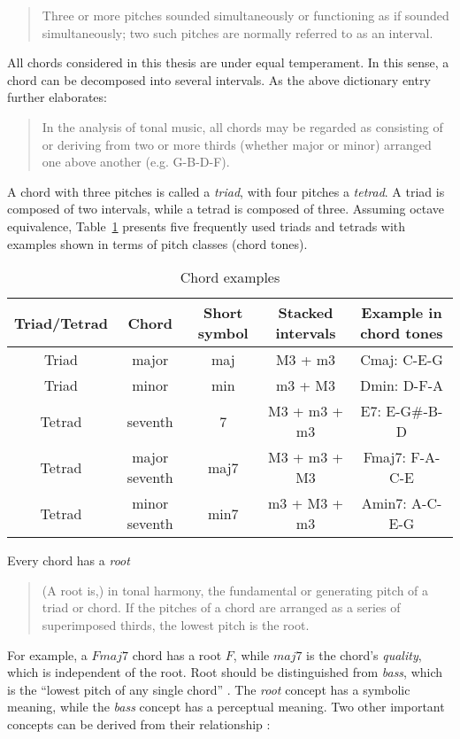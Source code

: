 \begin{quote}
Three or more pitches sounded simultaneously or functioning as if sounded simultaneously; two such pitches are normally referred to as an interval.
\end{quote}

All chords considered in this thesis are under equal temperament. In this sense, a chord can be decomposed into several intervals. As the above dictionary entry further elaborates:

\begin{quote}
In the analysis of tonal music, all chords may be regarded as consisting of or deriving from two or more thirds (whether major or minor) arranged one above another (e.g. G-B-D-F).
\end{quote}

A chord with three pitches is called a {\it triad}, with four pitches a {\it tetrad}. A triad is composed of two intervals, while a tetrad is composed of three. Assuming octave equivalence, Table~\ref{tab:2-chords} presents five frequently used triads and tetrads with examples shown in terms of pitch classes (chord tones).
\begin{table}
\caption{Chord examples}
\centering
\scriptsize
\begin{tabular}{|c|c|c|c|c|} \hline
Triad/Tetrad & Chord & Short symbol & Stacked intervals & Example in chord tones \\ \hline
Triad & major & maj & M3 + m3 & Cmaj: C-E-G \\ \hline
Triad & minor & min & m3 + M3 & Dmin: D-F-A \\ \hline
Tetrad  & seventh & 7 & M3 + m3 + m3 & E7: E-G\#-B-D \\ \hline
Tetrad & major seventh & maj7 & M3 + m3 + M3 & Fmaj7: F-A-C-E \\ \hline
Tetrad & minor seventh & min7 & m3 + M3 + m3 & Amin7: A-C-E-G \\ \hline
\end{tabular}
\label{tab:2-chords}
\end{table}
Every chord has a {\it root} \cite{randel1999harvard}
\begin{quote}
(A root is,) in tonal harmony, the fundamental or generating pitch of a triad or chord. If the pitches of a chord are arranged as a series of superimposed thirds, the lowest pitch is the root.
\end{quote}
For example, a $Fmaj7$ chord has a root $F$, while $maj7$ is the chord's {\it quality}, which is independent of the root. Root should be distinguished from {\it bass}, which is the ``lowest pitch of any single chord'' \cite{randel1999harvard}. The {\it root} concept has a symbolic meaning, while the {\it bass} concept has a perceptual meaning. Two other important concepts can be derived from their relationship \cite{randel1999harvard}:

